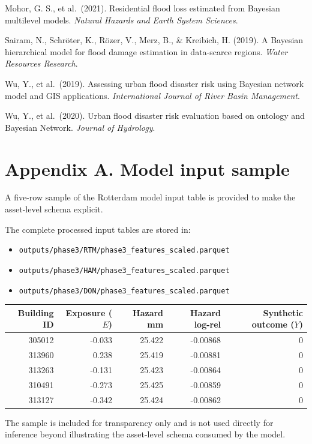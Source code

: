 \documentclass[
]{article}
\providecommand{\tightlist}{%
  \setlength{\itemsep}{0pt}\setlength{\parskip}{0pt}}
\begin{document}
Mohor, G. S., et al.~(2021). Residential flood loss estimated from
Bayesian multilevel models. \emph{Natural Hazards and Earth System
Sciences}.

Sairam, N., Schröter, K., Rözer, V., Merz, B., \& Kreibich, H. (2019). A
Bayesian hierarchical model for flood damage estimation in data-scarce
regions. \emph{Water Resources Research}.

Wu, Y., et al.~(2019). Assessing urban flood disaster risk using
Bayesian network model and GIS applications. \emph{International Journal
of River Basin Management}.

Wu, Y., et al.~(2020). Urban flood disaster risk evaluation based on
ontology and Bayesian Network. \emph{Journal of Hydrology}.

\section{Appendix A. Model input
sample}\label{appendix-a.-model-input-sample}

A five-row sample of the Rotterdam model input table is provided to make
the asset-level schema explicit.

The complete processed input tables are stored in:

\begin{itemize}
\tightlist
\item
  \texttt{outputs/phase3/RTM/phase3\_features\_scaled.parquet}
\item
  \texttt{outputs/phase3/HAM/phase3\_features\_scaled.parquet}
\item
  \texttt{outputs/phase3/DON/phase3\_features\_scaled.parquet}
\end{itemize}

\begin{table}[H]
\centering
\small
\begin{tabular}{rrrrr}
\toprule
Building ID & Exposure ($E$) & Hazard mm & Hazard log-rel & Synthetic outcome ($Y$) \\
\midrule
305012 & -0.033 & 25.422 & -0.00868 & 0 \\
313960 & 0.238 & 25.419 & -0.00881 & 0 \\
313263 & -0.131 & 25.423 & -0.00864 & 0 \\
310491 & -0.273 & 25.425 & -0.00859 & 0 \\
313127 & -0.342 & 25.424 & -0.00862 & 0 \\
\bottomrule
\end{tabular}
\end{table}

The sample is included for transparency only and is not used directly
for inference beyond illustrating the asset-level schema consumed by the
model.
\end{document}
